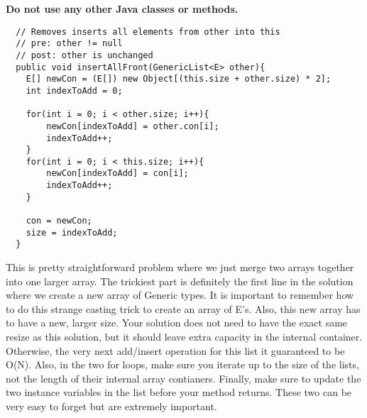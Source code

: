 \documentclass[12pt,letter]{article}
\begin{document}
\noindent \textbf{Do not use any other Java classes or methods.}

\clearpage
\begin{verbatim}
  // Removes inserts all elements from other into this
  // pre: other != null
  // post: other is unchanged
  public void insertAllFront(GenericList<E> other){
    E[] newCon = (E[]) new Object[(this.size + other.size) * 2];
    int indexToAdd = 0;

    for(int i = 0; i < other.size; i++){
        newCon[indexToAdd] = other.con[i];
        indexToAdd++;
    }
    for(int i = 0; i < this.size; i++){
        newCon[indexToAdd] = con[i];
        indexToAdd++;
    }

    con = newCon;
    size = indexToAdd;
  }
\end{verbatim}

This is pretty straightforward problem where we just merge two arrays together into one larger array.
The trickiest part is definitely the first line in the solution where we create a new array of Generic
types. It is important to remember how to do this strange casting trick to create an array of E's. Also,
this new array has to have a new, larger size. Your solution does not need to have the exact same resize
as this solution, but it should leave extra capacity in the internal container. Otherwise, the very next
add/insert operation for this list it guaranteed to be O(N). 
Also, in the two for loops, make sure you iterate up to the size of the lists, not the length of 
their internal array contianers.
Finally, make sure to update the two instance variables in the list before your method returns. These
two can be very easy to forget but are extremely important.
\end{document}
